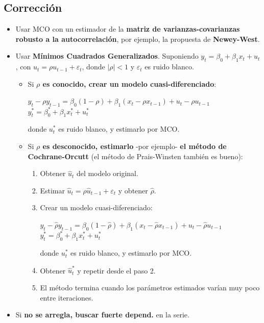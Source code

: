 \documentclass[10pt, a4paper, landscape]{extarticle}
\begin{document}
\begin{multicols}{3}
	\subsection*{Corrección}
		\begin{itemize}[leftmargin=*]
			\item Usar MCO con un estimador de la \textbf{matriz de varianzas-covarianzas} \textbf{robusto a la autocorrelación}, por ejemplo, la propuesta de \textbf{Newey-West}.
			\item Usar \textbf{Mínimos Cuadrados Generalizados}. Suponiendo $y_t = \beta_0 + \beta_1 x_t + u_t$, con $u_t = \rho u_{t-1} + \varepsilon_t$, donde $|\rho| < 1$ y $\varepsilon_t$ es ruido blanco.
			\begin{itemize}[leftmargin=*]
				\item Si \textbf{$\rho$ es conocido, crear un modelo cuasi-diferenciado}:
				\begin{center}
					$y_t - \rho y_{t-1} = \beta_0 (1 - \rho) + \beta_1 (x_t - \rho x_{t-1}) + u_t - \rho u_{t-1}$
					\ $y_t^* = \beta_0^* + \beta_1 x_t^* + u_t^*$
				\end{center}
				donde $u_t^*$ es ruido blanco, y estimarlo por MCO.
				\item Si \textbf{$\rho$ es desconocido, estimarlo} -por ejemplo- \textbf{el método de Cochrane-Orcutt} (el método de Prais-Winsten también es bueno):
				\begin{enumerate}[leftmargin=*]
					\item Obtener $\hat{u}_t$ del modelo original.
					\item Estimar $\hat{u}_t = \rho \hat{u}_{t-1} + \varepsilon_t$ y obtener $\hat{\rho}$.
					\item Crear un modelo cuasi-diferenciado:
					\begin{center}
						$y_t - \hat{\rho} y_{t-1} = \beta_0 (1 - \hat{\rho}) + \beta_1 (x_t - \hat{\rho} x_{t-1}) + u_t - \hat{\rho} u_{t-1}$
						\ $y_t^* = \beta_0^* + \beta_1 x_t^* + u_t^*$
					\end{center}
					donde $u_t^*$ es ruido blanco, y estimarlo por MCO.
					\item Obtener $\hat{u}_t^*$ y repetir desde el paso 2.
					\item El método termina cuando los parámetros estimados varían muy poco entre iteraciones.
				\end{enumerate}
			\end{itemize}
		\item Si \textbf{no se arregla, buscar fuerte depend.} en la serie.
		\end{itemize}


\end{multicols}
\end{document}
